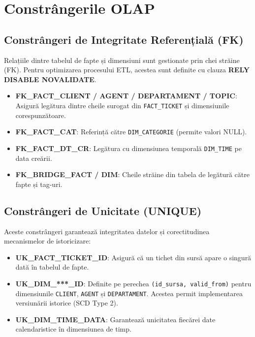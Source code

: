 \chapter{Constrângerile OLAP}
\label{sec:constrainturi}

\section{Constrângeri de Integritate Referențială (FK)}

Relațiile dintre tabelul de fapte și dimensiuni sunt gestionate prin chei străine (FK). Pentru optimizarea procesului ETL, acestea sunt definite cu clauza \textbf{RELY DISABLE NOVALIDATE}.

\begin{itemize}
    \item \textbf{FK\_FACT\_CLIENT / AGENT / DEPARTAMENT / TOPIC}: Asigură legătura dintre cheile surogat din \texttt{FACT\_TICKET} și dimensiunile corespunzătoare.
    \item \textbf{FK\_FACT\_CAT}: Referință către \texttt{DIM\_CATEGORIE} (permite valori NULL).
    \item \textbf{FK\_FACT\_DT\_CR}: Legătura cu dimensiunea temporală \texttt{DIM\_TIME} pe data creării.
    \item \textbf{FK\_BRIDGE\_FACT / DIM}: Cheile străine din tabela de legătură către fapte și tag-uri.
\end{itemize}

\section{Constrângeri de Unicitate (UNIQUE)}

Aceste constrângeri garantează integritatea datelor și corectitudinea mecanismelor de istoricizare:

\begin{itemize}
    \item \textbf{UK\_FACT\_TICKET\_ID}: Asigură că un tichet din sursă apare o singură dată în tabelul de fapte.
    \item \textbf{UK\_DIM\_***\_ID}: Definite pe perechea \texttt{(id\_sursa, valid\_from)} pentru dimensiunile \texttt{CLIENT}, \texttt{AGENT} și \texttt{DEPARTAMENT}. Acestea permit implementarea versiunării istorice (SCD Type 2).
    \item \textbf{UK\_DIM\_TIME\_DATA}: Garantează unicitatea fiecărei date calendaristice în dimensiunea de timp.
\end{itemize}

